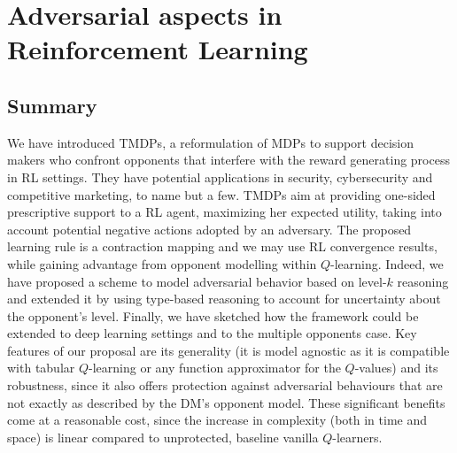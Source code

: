 \section{Adversarial aspects in Reinforcement Learning}\label{sec:final}

\subsection{Summary}

We have introduced TMDPs, a reformulation of MDPs to 
 support decision makers who confront opponents that interfere 
with the reward generating process in RL settings.
They have potential applications in security, cybersecurity and 
competitive marketing, to name but a few.
TMDPs aim at providing one-sided prescriptive support to a RL agent, maximizing her expected utility, taking into account potential negative actions adopted by an adversary. %
  The proposed learning rule is a contraction mapping and we may use RL convergence results, while gaining advantage from 
  opponent modelling within $Q$-learning. Indeed, we have proposed a scheme to model adversarial behavior based on level-$k$ reasoning
and extended it by using type-based reasoning to account for uncertainty about the opponent's level. Finally, we have sketched how the framework could be extended to deep learning settings and to the multiple opponents case. Key features of our proposal are its generality
(it is model agnostic as it is compatible with tabular $Q$-learning or any function approximator for the $Q$-values) and its robustness, since it also offers 
protection against adversarial behaviours that are not exactly as described by the DM's opponent model. These significant benefits come at a reasonable cost, since the increase in complexity (both in time and space) is linear compared to unprotected, baseline vanilla $Q$-learners.


